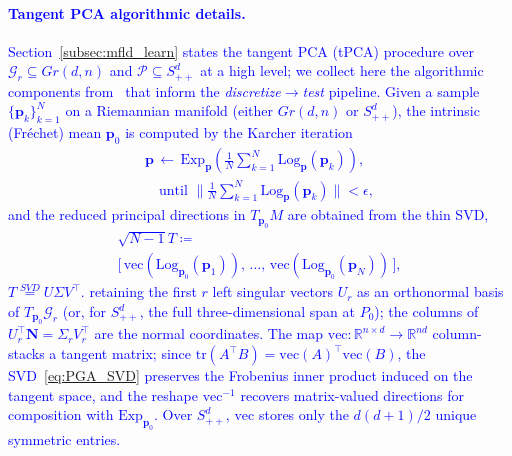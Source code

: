 \documentclass[pdflatex,iicol]{sn-jnl}%
\theoremstyle{thmstyleone}%
\theoremstyle{thmstyletwo}%
\theoremstyle{thmstylethree}%
\begin{document}
\begin{appendices}
\textcolor{blue}{\paragraph{Tangent PCA algorithmic details.}
Section~\ref{subsec:mfld_learn} states the tangent PCA (tPCA) procedure over $\mathcal{G}_r \subseteq Gr(d,n)$ and $\mathcal{P}\subseteq S^d_{++}$ at a high level; we collect here the algorithmic components from~\cite{grey2023separable,fletcher2003statistics,fletcher2004principal,edelman1998geometry,bendokat2020grassmann} that inform the \emph{discretize}$\to$\emph{test} pipeline. Given a sample $\lbrace \boldsymbol{p}_k\rbrace_{k=1}^N$ on a Riemannian manifold (either $Gr(d,n)$ or $S^d_{++}$), the intrinsic (Fr\'echet) mean $\boldsymbol{p}_0$ is computed by the Karcher iteration~\cite{pennec1999probabilities}
\begin{multline}\label{eq:Frechet_iter}
    \boldsymbol{p} \,\leftarrow\, \mathrm{Exp}_{\boldsymbol{p}}\!\left(\tfrac{1}{N}\sum_{k=1}^N \mathrm{Log}_{\boldsymbol{p}}(\boldsymbol{p}_k)\right), \\
    \quad \text{until } \Big\|\tfrac{1}{N}\sum_{k=1}^N \mathrm{Log}_{\boldsymbol{p}}(\boldsymbol{p}_k)\Big\| < \epsilon,
\end{multline}
and the reduced principal directions in $T_{\boldsymbol{p}_0}M$ are obtained from the thin SVD,
\begin{multline}\label{eq:PGA_SVD}
    \sqrt{N-1}T \coloneqq \\
    \big[\,\mathrm{vec}(\mathrm{Log}_{\boldsymbol{p}_0}(\boldsymbol{p}_1)),\,\dots,
    \,\mathrm{vec}(\mathrm{Log}_{\boldsymbol{p}_0}(\boldsymbol{p}_N))\,\big],  
\end{multline}
$T\overset{SVD}{=} U\Sigma V^{\top}$. retaining the first $r$ left singular vectors $U_r$ as an orthonormal basis of $T_{\boldsymbol{p}_0}\mathcal{G}_r$ (or, for $S^d_{++}$, the full three-dimensional span at $P_0$); the columns of $ U_r^{\top}\boldsymbol{N} = \Sigma_r V_r^{\top}$ are the normal coordinates. The map $\mathrm{vec}:\mathbb{R}^{n\times d}\to\mathbb{R}^{nd}$ column-stacks a tangent matrix; since $\mathrm{tr}(A^{\top}B)=\mathrm{vec}(A)^{\top}\mathrm{vec}(B)$, the SVD~\eqref{eq:PGA_SVD} preserves the Frobenius inner product induced on the tangent space, and the reshape $\mathrm{vec}^{-1}$ recovers matrix-valued directions for composition with $\mathrm{Exp}_{\boldsymbol{p}_0}$. Over $S^d_{++}$, $\mathrm{vec}$ stores only the $d(d+1)/2$ unique symmetric entries.}


\end{appendices}
\end{document}
